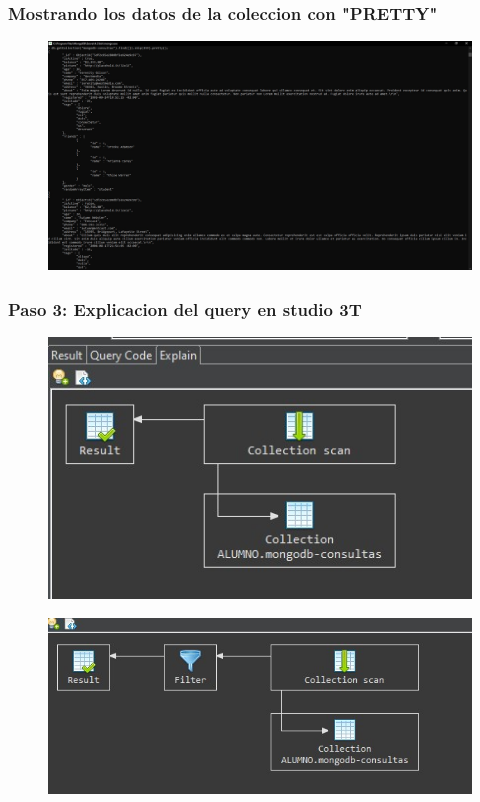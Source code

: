 \documentclass[preprint,12pt]{elsarticle}
\begin{document}
\subsubsection{\textbf{Mostrando los datos de la coleccion con "PRETTY"}}
\begin{figure}[H]
	\begin{center}
		\includegraphics[width=12cm]{./IMAGENES/8} 
	\end{center}
\end{figure}

\subsubsection{\textbf{Paso 3: Explicacion del query en studio 3T}}
\begin{figure}[H]
	\begin{center}
		\includegraphics[width=12cm]{./IMAGENES/9} 
	\end{center}
\end{figure}

\begin{figure}[H]
	\begin{center}
		\includegraphics[width=12cm]{./IMAGENES/10} 
	\end{center}
\end{figure}
\end{document}
